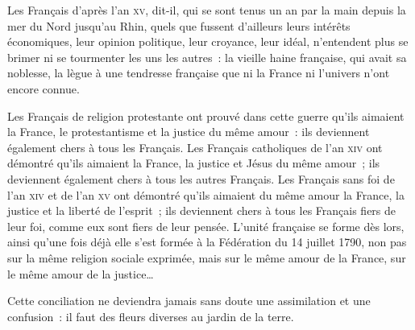 \documentclass[french,twoside]{book} %
\newenvironment{quoteblock}%
  {\begin{quoting}}
  {\end{quoting}}
\newenvironment{quotebar}{%
    \def\FrameCommand{{\color{rubric!10!}\vrule width 0.5em} \hspace{0.9em}}%
    \def\OuterFrameSep{\itemsep} %
    \MakeFramed {\advance\hsize-\width \FrameRestore}
  }%
  {%
    \endMakeFramed
  }
\renewenvironment{quoteblock}%
  {%
    \savenotes
    \setstretch{0.9}
    \normalfont
    \begin{quotebar}
  }
  {%
    \end{quotebar}
    \spewnotes
  }
\begin{document}
\begin{quoteblock}
 \noindent Les Français d’après l’an \textsc{xv}, dit-il, qui se sont tenus un an par la main depuis la mer du Nord jusqu’au Rhin, quels que fussent d’ailleurs leurs intérêts économiques, leur opinion politique, leur croyance, leur idéal, n’entendent plus se brimer ni se tourmenter les uns les autres : la vieille haine française, qui avait sa noblesse, la lègue à une tendresse française que ni la France ni l’univers n’ont encore connue.‌\par
 Les Français de religion protestante ont prouvé dans cette guerre qu’ils aimaient la France, le protestantisme et la justice du même amour : ils deviennent également chers à tous les Français. Les Français catholiques de l’an \textsc{xiv} ont démontré qu’ils aimaient la France, la justice et Jésus du même amour ; ils deviennent également chers à tous les autres Français. Les Français sans foi de l’an \textsc{xiv} et de l’an \textsc{xv} ont démontré qu’ils aimaient du même amour la France, la justice et la liberté de l’esprit ; ils deviennent chers à tous les Français fiers de leur foi, comme eux sont fiers de leur pensée. L’unité française se forme dès lors, ainsi qu’une fois déjà elle s’est formée à la Fédération du 14 juillet 1790, non pas sur la même religion sociale exprimée, mais sur le même amour de la France, sur le même amour de la justice…‌\par
 Cette conciliation ne deviendra jamais sans doute une assimilation et une confusion : il faut des fleurs diverses au jardin de la terre.‌
 \end{quoteblock}
\end{document}
